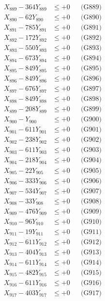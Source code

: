 \documentclass[a4paper,10pt]{article}
\begin{document}
{\begin{align}
X_{889} - 364Y_{889} &\leq +0 && \text{(G889)} \\
X_{890} - 62Y_{890} &\leq +0 && \text{(G890)} \\
\allowbreak
X_{891} - 785Y_{891} &\leq +0 && \text{(G891)} \\
X_{892} - 172Y_{892} &\leq +0 && \text{(G892)} \\
X_{893} - 550Y_{893} &\leq +0 && \text{(G893)} \\
X_{894} - 673Y_{894} &\leq +0 && \text{(G894)} \\
X_{895} - 849Y_{895} &\leq +0 && \text{(G895)} \\
X_{896} - 849Y_{896} &\leq +0 && \text{(G896)} \\
X_{897} - 676Y_{897} &\leq +0 && \text{(G897)} \\
X_{898} - 849Y_{898} &\leq +0 && \text{(G898)} \\
X_{899} - 208Y_{899} &\leq +0 && \text{(G899)} \\
X_{900} - Y_{900} &\leq +0 && \text{(G900)} \\
\allowbreak
X_{901} - 611Y_{901} &\leq +0 && \text{(G901)} \\
X_{902} - 238Y_{902} &\leq +0 && \text{(G902)} \\
X_{903} - 611Y_{903} &\leq +0 && \text{(G903)} \\
X_{904} - 218Y_{904} &\leq +0 && \text{(G904)} \\
X_{905} - 22Y_{905} &\leq +0 && \text{(G905)} \\
X_{906} - 333Y_{906} &\leq +0 && \text{(G906)} \\
X_{907} - 534Y_{907} &\leq +0 && \text{(G907)} \\
X_{908} - 33Y_{908} &\leq +0 && \text{(G908)} \\
X_{909} - 476Y_{909} &\leq +0 && \text{(G909)} \\
X_{910} - 96Y_{910} &\leq +0 && \text{(G910)} \\
\allowbreak
X_{911} - 19Y_{911} &\leq +0 && \text{(G911)} \\
X_{912} - 611Y_{912} &\leq +0 && \text{(G912)} \\
X_{913} - 404Y_{913} &\leq +0 && \text{(G913)} \\
X_{914} - 611Y_{914} &\leq +0 && \text{(G914)} \\
X_{915} - 482Y_{915} &\leq +0 && \text{(G915)} \\
X_{916} - 611Y_{916} &\leq +0 && \text{(G916)} \\
X_{917} - 403Y_{917} &\leq +0 && \text{(G917)} \\

\end{align}}
\end{document}
